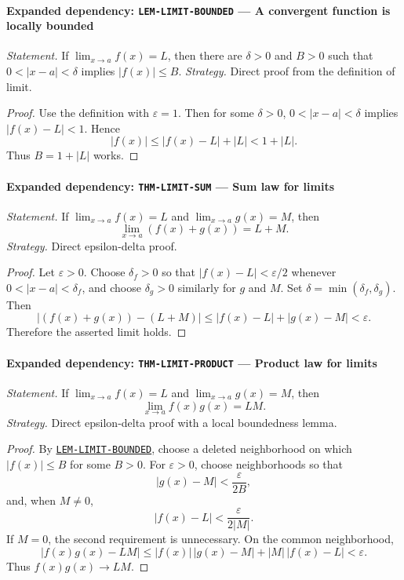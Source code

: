 \documentclass[10pt]{article}
\newcommand{\pidraw}[1]{\begingroup\urlstyle{tt}\nolinkurl{#1}\endgroup}
\newcommand{\pidref}[1]{\hyperref[prf:#1]{\pidraw{#1}}}
\newcommand{\pid}[1]{\pidref{#1}}
\theoremstyle{definition}
\theoremstyle{remark}
\begin{document}
\paragraph{Expanded dependency: \pidraw{LEM-LIMIT-BOUNDED} --- A convergent function is locally bounded}
\textit{Statement.} If $\lim_{x\to a}f(x)=L$, then there are $\delta>0$ and $B>0$ such that
$0<|x-a|<\delta$ implies $|f(x)|\le B$.
\textit{Strategy.} Direct proof from the definition of limit.
\begin{proof}Use the definition with $\varepsilon=1$. Then for some $\delta>0$,
$0<|x-a|<\delta$ implies $|f(x)-L|<1$. Hence
\[
|f(x)|\le |f(x)-L|+|L|<1+|L|.
\]
Thus $B=1+|L|$ works.\end{proof}

\paragraph{Expanded dependency: \pidraw{THM-LIMIT-SUM} --- Sum law for limits}
\textit{Statement.} If $\lim_{x\to a}f(x)=L$ and $\lim_{x\to a}g(x)=M$, then
\[
\lim_{x\to a}(f(x)+g(x))=L+M.
\]
\textit{Strategy.} Direct epsilon-delta proof.
\begin{proof}Let $\varepsilon>0$. Choose $\delta_f>0$ so that
$|f(x)-L|<\varepsilon/2$ whenever $0<|x-a|<\delta_f$, and choose
$\delta_g>0$ similarly for $g$ and $M$. Set
$\delta=\min(\delta_f,\delta_g)$. Then
\[
|(f(x)+g(x))-(L+M)|
\le |f(x)-L|+|g(x)-M|<\varepsilon.
\]
Therefore the asserted limit holds.\end{proof}

\paragraph{Expanded dependency: \pidraw{THM-LIMIT-PRODUCT} --- Product law for limits}
\textit{Statement.} If $\lim_{x\to a}f(x)=L$ and $\lim_{x\to a}g(x)=M$, then
\[
\lim_{x\to a}f(x)g(x)=LM.
\]
\textit{Strategy.} Direct epsilon-delta proof with a local boundedness lemma.
\begin{proof}By \pid{LEM-LIMIT-BOUNDED}, choose a deleted neighborhood on which
$|f(x)|\le B$ for some $B>0$. For $\varepsilon>0$, choose neighborhoods so that
\[
|g(x)-M|<\frac{\varepsilon}{2B},
\]
and, when $M\ne0$,
\[
|f(x)-L|<\frac{\varepsilon}{2|M|}.
\]
If $M=0$, the second requirement is unnecessary. On the common neighborhood,
\[
|f(x)g(x)-LM|
\le |f(x)|\,|g(x)-M|+|M|\,|f(x)-L|<\varepsilon.
\]
Thus $f(x)g(x)\to LM$.\end{proof}
\end{document}
